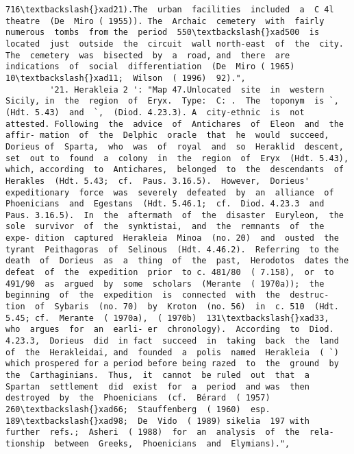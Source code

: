 \documentclass[11pt]{article}
\begin{document}
\begin{Verbatim}[commandchars=\\\{\}]
716\textbackslash{}xad21).The  urban  facilities  included  a  C 4l  theatre  (De  Miro ( 1955)). The  Archaic  cemetery  with  fairly  numerous  tombs  from the  period  550\textbackslash{}xad500  is  located  just  outside  the  circuit  wall north-east  of  the  city.  The  cemetery  was  bisected  by  a  road, and  there  are  indications  of  social  differentiation  (De  Miro ( 1965)  10\textbackslash{}xad11;  Wilson  ( 1996)  92).",
         '21. Herakleia 2 ': "Map 47.Unlocated  site  in  western  Sicily, in  the  region  of  Eryx.  Type:  C: .  The  toponym  is `,  (Hdt. 5.43)  and  `,  (Diod. 4.23.3). A  city-ethnic  is  not  attested. Following  the  advice  of  Antichares  of  Eleon  and  the  affir- mation  of  the  Delphic  oracle  that  he  would  succeed,  Dorieus of  Sparta,  who  was  of  royal  and  so  Heraklid  descent,  set  out to  found  a  colony  in  the  region  of  Eryx  (Hdt. 5.43),  which, according  to  Antichares,  belonged  to  the  descendants  of Herakles  (Hdt. 5.43;  cf.  Paus. 3.16.5).  However,  Dorieus' expeditionary  force  was  severely  defeated  by  an  alliance  of Phoenicians  and  Egestans  (Hdt. 5.46.1;  cf.  Diod. 4.23.3  and Paus. 3.16.5).  In  the  aftermath  of  the  disaster  Euryleon,  the sole  survivor  of  the  synktistai,  and  the  remnants  of  the  expe- dition  captured  Herakleia  Minoa  (no. 20)  and  ousted  the tyrant  Peithagoras  of  Selinous  (Hdt. 4.46.2).  Referring  to the  death  of  Dorieus  as  a  thing  of  the  past,  Herodotos  dates the  defeat  of  the  expedition  prior  to c. 481/80  ( 7.158),  or  to 491/90  as  argued  by  some  scholars  (Merante  ( 1970a));  the beginning  of  the  expedition  is  connected  with  the  destruc- tion  of  Sybaris  (no. 70)  by  Kroton  (no. 56)  in  c. 510  (Hdt. 5.45; cf.  Merante  ( 1970a),  ( 1970b)  131\textbackslash{}xad33,  who  argues  for  an  earli- er  chronology).  According  to  Diod. 4.23.3,  Dorieus  did  in fact  succeed  in  taking  back  the  land  of  the  Herakleidai, and  founded  a  polis  named  Herakleia  ( `) which prospered for a period before being razed  to  the  ground  by  the  Carthaginians.  Thus,  it  cannot  be ruled  out  that  a  Spartan  settlement  did  exist  for  a  period  and was  then  destroyed  by  the  Phoenicians  (cf.  Bérard  ( 1957) 260\textbackslash{}xad66;  Stauffenberg  ( 1960)  esp. 189\textbackslash{}xad98;  De  Vido  ( 1989) sikelia  197 with  further  refs.;  Asheri  ( 1988)  for  an  analysis  of  the  rela- tionship  between  Greeks,  Phoenicians  and  Elymians).",

\end{Verbatim}
\end{document}
